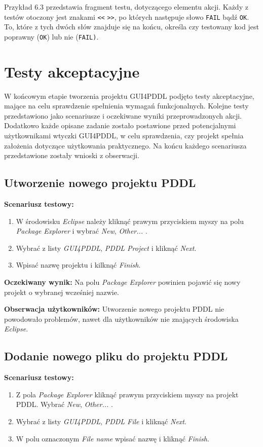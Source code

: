 Przykład 6.3 przedstawia fragment testu, dotyczącego elementu akcji. Każdy z testów otoczony jest znakami \texttt{<<} \texttt{>>}, po których następuje słowo \texttt{FAIL} bądź \texttt{OK}. To, które z tych dwóch słów znajduje się na końcu, określa czy testowany kod jest poprawny (\texttt{OK}) lub nie (\texttt{FAIL)}.




\section{Testy akceptacyjne}
W końcowym etapie tworzenia projektu GUI4PDDL podjęto testy akceptacyjne, mające na celu sprawdzenie spełnienia wymagań funkcjonalnych. Kolejne testy przedstawiono jako scenariusze i oczekiwane wyniki przeprowadzonych akcji.
Dodatkowo każde opisane zadanie zostało postawione przed potencjalnymi użytkownikami wtyczki GUI4PDDL, w celu sprawdzenia, czy projekt spełnia założenia dotyczące użytkowania praktycznego. Na końcu każdego scenariusza przedstawione zostały wnioski z obserwacji. 
\subsection{Utworzenie nowego projektu PDDL}
\textbf{Scenariusz testowy:}
  \begin{enumerate}
  
\item W środowisku \textit{Eclipse} należy kliknąć prawym przyciskiem myszy na polu \textit{Package Explorer} i wybrać \textit{New}, \textit{Other...} .
\item Wybrać z listy \textit{GUI4PDDL}, \textit{PDDL Project} i kliknąć \textit{Next}.
\item Wpisać nazwę projektu i kilknąć \textit{Finish}.
\end{enumerate}

\textbf{Oczekiwany wynik:} Na polu \textit{Package Explorer} powinien pojawić się nowy projekt o wybranej wcześniej nazwie.

\textbf{Obserwacja użytkowników:} Utworzenie nowego projektu PDDL nie powodowało problemów, nawet dla użytkowników nie znających środowiska \textit{Eclipse}.
\subsection{Dodanie nowego pliku do projektu PDDL}
\textbf{Scenariusz testowy:}
  \begin{enumerate}
  
\item Z pola \textit{Package Explorer} kliknąć prawym przyciskiem myszy na projekt PDDL. Wybrać \textit{New}, \textit{Other...} .
\item Wybrać z listy \textit{GUI4PDDL}, \textit{PDDL File} i kliknąć \textit{Next}.
\item W polu oznaczonym \textit{File name} wpisać nazwę i kliknąć \textit{Finish}.
\end{enumerate}

